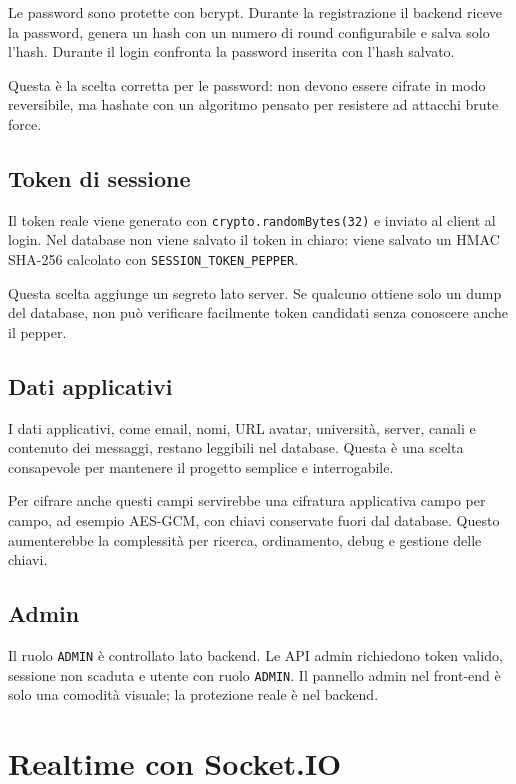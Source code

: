 \documentclass[11pt,a4paper]{article}
\begin{document}
Le password sono protette con bcrypt. Durante la registrazione il backend riceve la password, genera un hash con un numero di round configurabile e salva solo l'hash. Durante il login confronta la password inserita con l'hash salvato.

Questa è la scelta corretta per le password: non devono essere cifrate in modo reversibile, ma hashate con un algoritmo pensato per resistere ad attacchi brute force.

\subsection{Token di sessione}

Il token reale viene generato con \texttt{crypto.randomBytes(32)} e inviato al client al login. Nel database non viene salvato il token in chiaro: viene salvato un HMAC SHA-256 calcolato con \texttt{SESSION\_TOKEN\_PEPPER}.

Questa scelta aggiunge un segreto lato server. Se qualcuno ottiene solo un dump del database, non può verificare facilmente token candidati senza conoscere anche il pepper.

\subsection{Dati applicativi}

I dati applicativi, come email, nomi, URL avatar, università, server, canali e contenuto dei messaggi, restano leggibili nel database. Questa è una scelta consapevole per mantenere il progetto semplice e interrogabile.

Per cifrare anche questi campi servirebbe una cifratura applicativa campo per campo, ad esempio AES-GCM, con chiavi conservate fuori dal database. Questo aumenterebbe la complessità per ricerca, ordinamento, debug e gestione delle chiavi.

\subsection{Admin}

Il ruolo \texttt{ADMIN} è controllato lato backend. Le API admin richiedono token valido, sessione non scaduta e utente con ruolo \texttt{ADMIN}. Il pannello admin nel front-end è solo una comodità visuale; la protezione reale è nel backend.

\section{Realtime con Socket.IO}
\end{document}
